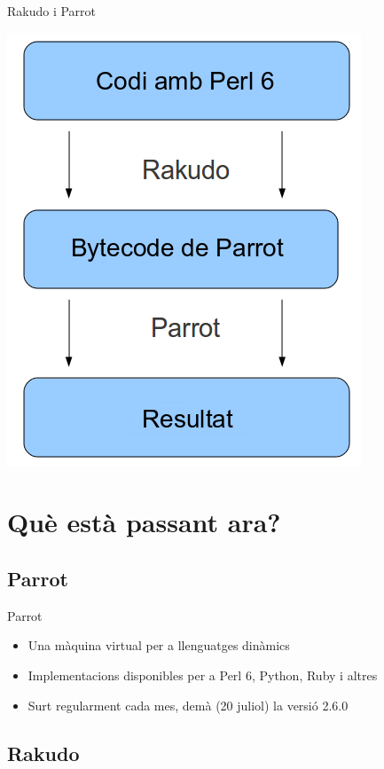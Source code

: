 \documentclass{beamer}
\begin{document}
\begin{frame}{Rakudo i Parrot}
	\begin{center}
		\includegraphics[scale=0.4]{bohomaz_ca}
	\end{center}
\end{frame}
			\section{Què està passant ara?}
			\subsection{Parrot}

\begin{frame}{Parrot}
	\begin{itemize}
		\item Una màquina virtual per a llenguatges dinàmics
		\item Implementacions disponibles per a Perl 6, Python, Ruby i altres
		\item Surt regularment cada mes, demà (20 juliol) la versió 2.6.0
	\end{itemize}
\end{frame}

			\subsection{Rakudo}
\end{document}
